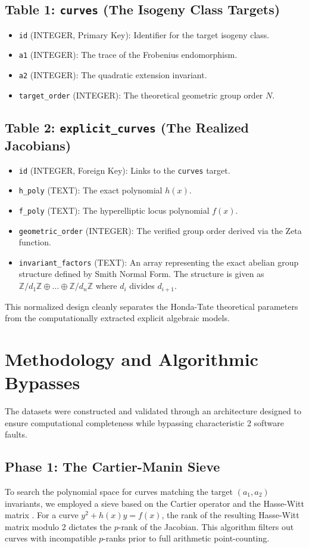 \documentclass[letterpaper, 11pt]{article}
\begin{document}
\subsection{Table 1: \texttt{curves} (The Isogeny Class Targets)}
\begin{itemize}
    \item \texttt{id} (INTEGER, Primary Key): Identifier for the target isogeny class.
    \item \texttt{a1} (INTEGER): The trace of the Frobenius endomorphism.
    \item \texttt{a2} (INTEGER): The quadratic extension invariant.
    \item \texttt{target\_order} (INTEGER): The theoretical geometric group order $N$.
\end{itemize}

\subsection{Table 2: \texttt{explicit\_curves} (The Realized Jacobians)}
\begin{itemize}
    \item \texttt{id} (INTEGER, Foreign Key): Links to the \texttt{curves} target.
    \item \texttt{h\_poly} (TEXT): The exact polynomial $h(x)$.
    \item \texttt{f\_poly} (TEXT): The hyperelliptic locus polynomial $f(x)$.
    \item \texttt{geometric\_order} (INTEGER): The verified group order derived via the Zeta function.
    \item \texttt{invariant\_factors} (TEXT): An array representing the exact abelian group structure defined by Smith Normal Form. The structure is given as $\mathbb{Z}/d_1\mathbb{Z} \oplus \dots \oplus \mathbb{Z}/d_n\mathbb{Z}$ where $d_i$ divides $d_{i+1}$.
\end{itemize}
This normalized design cleanly separates the Honda-Tate theoretical parameters from the computationally extracted explicit algebraic models.

\section{Methodology and Algorithmic Bypasses}
The datasets were constructed and validated through an architecture designed to ensure computational completeness while bypassing characteristic 2 software faults.

\subsection{Phase 1: The Cartier-Manin Sieve}
To search the polynomial space for curves matching the target $(a_1, a_2)$ invariants, we employed a sieve based on the Cartier operator \cite{Cartier1958} and the Hasse-Witt matrix \cite{Manin1963}. For a curve $y^2 + h(x)y = f(x)$, the rank of the resulting Hasse-Witt matrix modulo 2 dictates the $p$-rank of the Jacobian. This algorithm filters out curves with incompatible $p$-ranks prior to full arithmetic point-counting.
\end{document}
